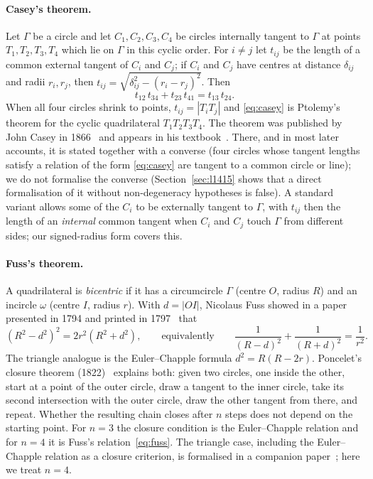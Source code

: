 \documentclass[11pt]{article}
\theoremstyle{definition}
\theoremstyle{remark}
\begin{document}
\paragraph{Casey's theorem.}
Let $\Gamma$ be a circle and let $C_1,C_2,C_3,C_4$ be circles internally tangent to $\Gamma$ at
points $T_1,T_2,T_3,T_4$ which lie on $\Gamma$ in this cyclic order. For $i\ne j$ let $t_{ij}$ be the
length of a common external tangent of $C_i$ and $C_j$; if $C_i$ and $C_j$ have centres at distance
$\delta_{ij}$ and radii $r_i,r_j$, then $t_{ij}=\sqrt{\delta_{ij}^2-(r_i-r_j)^2}$. Then
\begin{equation}\label{eq:casey}
t_{12}\,t_{34}+t_{23}\,t_{41}=t_{13}\,t_{24}.
\end{equation}
When all four circles shrink to points, $t_{ij}=|T_iT_j|$ and \eqref{eq:casey} is Ptolemy's theorem
for the cyclic quadrilateral $T_1T_2T_3T_4$. The theorem was published by John
Casey in 1866~\cite{Casey1866} and appears in his textbook~\cite{CaseySequel}.
There, and in most later accounts, it is stated together with a converse (four circles whose
tangent lengths satisfy a relation of the form \eqref{eq:casey} are tangent to a common circle or
line); we do not formalise the converse (Section~\ref{sec:l1415} shows that a direct formalisation of it without non-degeneracy hypotheses is false). A standard variant allows some of the $C_i$ to be externally
tangent to $\Gamma$, with $t_{ij}$ then the length of an \emph{internal} common tangent when $C_i$
and $C_j$ touch $\Gamma$ from different sides; our signed-radius form covers this.

\paragraph{Fuss's theorem.}
A quadrilateral is \emph{bicentric} if it has a circumcircle $\Gamma$ (centre $O$, radius $R$) and
an incircle $\omega$ (centre $I$, radius $r$). With $d=|OI|$, Nicolaus Fuss showed in
a paper presented in 1794 and printed in 1797~\cite{Fuss1797} that
\begin{equation}\label{eq:fuss}
(R^2-d^2)^2=2r^2(R^2+d^2),\qquad\text{equivalently}\qquad
\frac1{(R-d)^2}+\frac1{(R+d)^2}=\frac1{r^2}.
\end{equation}
The triangle analogue is the Euler--Chapple formula $d^2=R(R-2r)$. Poncelet's closure theorem
(1822)~\cite{Poncelet1822,Flatto} explains both: given two circles, one inside the other, start at a
point of the outer circle, draw a tangent to the inner circle, take its second intersection with
the outer circle, draw the other tangent from there, and repeat. Whether the resulting chain closes
after $n$ steps does not depend on the starting point. For $n=3$ the closure condition is the
Euler--Chapple relation and for $n=4$ it is Fuss's relation~\eqref{eq:fuss}. The triangle case,
including the Euler--Chapple relation as a closure criterion, is formalised in a companion
paper~\cite{BaldTriangles}; here we treat $n=4$.
\end{document}
